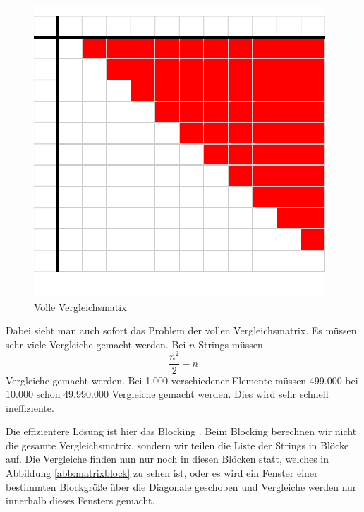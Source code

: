 \documentclass[sigconf]{acmart}
\begin{document}
\begin{figure}[htbp]
  \centering
  \includegraphics{table.pdf}
  \caption{Volle Vergleichsmatix}
  \label{abb:matrix}
\end{figure}

Dabei sieht man auch sofort das Problem der vollen Vergleichsmatrix.
Es müssen sehr viele Vergleiche gemacht werden. Bei $n$
Strings müssen
$$\frac{n^2}{2} - n$$
Vergleiche gemacht werden.
Bei 1.000 verschiedener
Elemente müssen 499.000 bei 10.000 schon 49.990.000 Vergleiche
gemacht werden. Dies wird sehr schnell ineffiziente.

Die effizientere Lösung ist hier das Blocking \cite[Vlg. S. 11]{elmagarmid1}.
Beim Blocking berechnen wir nicht die gesamte
Vergleichsmatrix, sondern wir teilen die Liste der Strings
in Blöcke auf. Die Vergleiche finden nun nur noch in diesen
Blöcken statt, welches in Abbildung \ref{abb:matrixblock} zu sehen ist,
oder es wird ein Fenster einer bestimmten Blockgröße über die
Diagonale geschoben und Vergleiche werden nur innerhalb
dieses Fensters gemacht.
\end{document}
